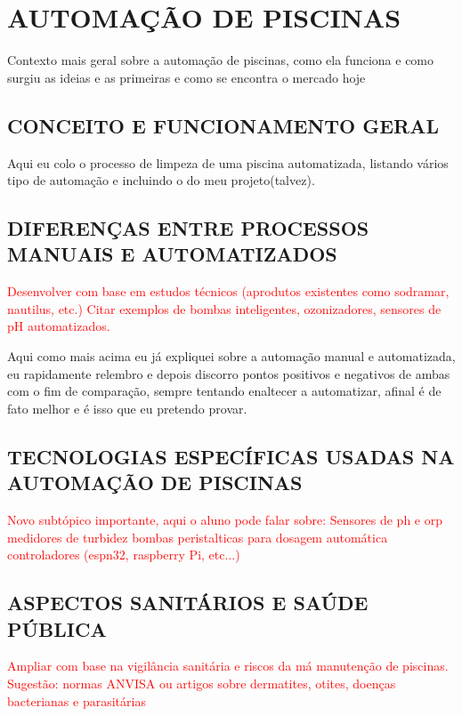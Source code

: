 \section{AUTOMAÇÃO DE PISCINAS}

    Contexto mais geral sobre a automação de piscinas, como ela funciona e como surgiu as ideias e as primeiras e como se encontra o mercado hoje

    \subsection{CONCEITO E FUNCIONAMENTO GERAL}
        Aqui eu colo o processo de limpeza de uma piscina automatizada, listando vários tipo de automação e incluindo o do meu projeto(talvez).

    \subsection{DIFERENÇAS ENTRE PROCESSOS MANUAIS E AUTOMATIZADOS}

        \textcolor{red}{Desenvolver com base em estudos técnicos (aprodutos existentes como sodramar, nautilus, etc.) Citar exemplos de bombas inteligentes, ozonizadores, sensores de pH automatizados.}
    
        Aqui como mais acima eu já expliquei sobre a automação manual e automatizada, eu rapidamente relembro e depois discorro pontos positivos e negativos de ambas com o fim de comparação, sempre tentando enaltecer a automatizar, afinal é de fato melhor e é isso que eu pretendo provar.
    
    \subsection{TECNOLOGIAS ESPECÍFICAS USADAS NA AUTOMAÇÃO DE PISCINAS}
        \textcolor{red}{Novo subtópico importante, aqui o aluno pode falar sobre: 
        Sensores de ph e orp
        medidores de turbidez
        bombas peristalticas para dosagem automática
        controladores (espn32, raspberry Pi, etc...)}

    \subsection{ASPECTOS SANITÁRIOS E SAÚDE PÚBLICA}
        \textcolor{red}{Ampliar com base na vigilância sanitária e riscos da má manutenção de piscinas. Sugestão: normas ANVISA ou artigos sobre dermatites, otites, doenças bacterianas e parasitárias}

